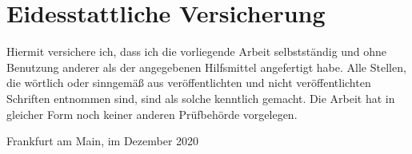 \chapter*{Eidesstattliche Versicherung}
Hiermit versichere ich, dass ich die vorliegende Arbeit selbstständig und ohne Benutzung anderer als der angegebenen Hilfsmittel angefertigt habe. Alle Stellen, die wörtlich oder sinngemäß aus veröffentlichten und nicht veröffentlichten Schriften entnommen sind, sind als solche kenntlich gemacht. Die Arbeit hat in gleicher Form noch keiner anderen Prüfbehörde vorgelegen. 


Frankfurt am Main, im Dezember 2020


